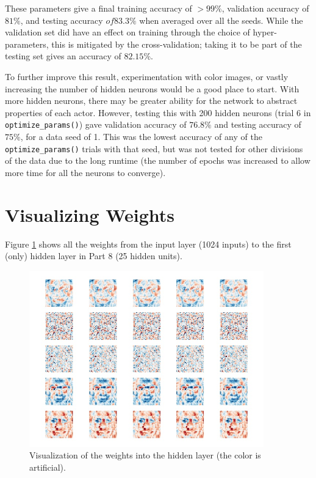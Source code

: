 \documentclass{article}
\begin{document}
   These parameters give a final training accuracy of $>99\%$, validation accuracy of $81\%$, and
   testing accuracy $of 83.3\%$ when averaged over all the seeds.
   While the validation set did have an effect on training through the choice of hyper-parameters,
   this is mitigated by the cross-validation; taking it to be part of the testing set gives an accuracy
   of $82.15\%$.

   To further improve this result, experimentation with color images, or vastly increasing the
   number of hidden neurons would be a good place to start. With more hidden neurons, there may be
   greater ability for the network to abstract properties of each actor. However, testing this
   with 200 hidden neurons (trial 6 in \texttt{optimize\_params()}) gave validation accuracy of
   $76.8\%$ and testing accuracy of $75\%$, for a data seed of 1. This was the lowest accuracy
   of any of the \texttt{optimize\_params()} trials with that seed, but was not tested for other
   divisions of the data due to the long runtime (the number of epochs was increased to allow more
   time for all the neurons to converge).


   \section{Visualizing Weights}
   Figure \ref{part9} shows all the weights from the input layer (1024 inputs) to the first (only)
   hidden layer in Part 8 (25 hidden units).

   \begin{figure}[h!] \centering
      \includegraphics[width=4in]{resources/part9}
      \caption{Visualization of the weights into the hidden layer (the color is artificial).}
      \label{part9}
    \end{figure}
\end{document}
